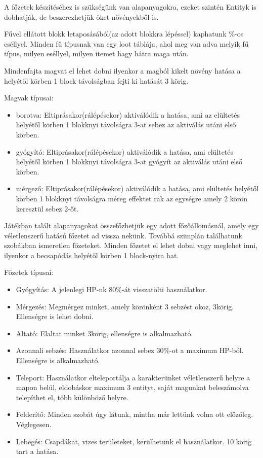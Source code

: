 A főzetek készítéséhez is szükségünk van alapanyagokra, ezeket szintén Entityk is dobhatják, de beszerezhetjük őket növényekből is.


Fűvel ellátott blokk letaposásából(az adott blokkra lépéssel) kaphatunk \%-os eséllyel.
Minden fű típusnak van egy loot táblája, ahol meg van adva melyik fű típus, milyen eséllyel, milyen itemet hagy hátra maga után.

Mindenfajta magvat el lehet dobni ilyenkor a magból kikelt növény hatása a helyétől körben 1 block távolságban fejti ki hatását 3 körig.

Magvak típusai:

\begin{itemize}
\item borotva: Eltiprásakor(rálépésekor) aktiválódik a hatása, ami az elültetés helyétől körben 1 blokknyi távolságra 3-at sebez az aktiválás utáni első körben.
\item gyógyító: Eltiprásakor(rálépésekor) aktiválódik a hatása, ami elültetés helyétől körben 1 blokknyi távolságra 3-at gyógyít az aktiválás utáni első körben.
\item mérgező: Eltiprásakor(rálépésekor) aktiválódik a hatása, ami elültetés helyétől körben 1 blokknyi távolságra méreg effektet rak az egységre amely 2 körön keresztül sebez 2-őt.
\end{itemize}



Játékban talált alapanyagokat összefőzhetjük egy adott főzőállomásnál, amely egy véletlenszerű hatású főzetet ad vissza nekünk.
Továbbá szimplán találhatunk szobákban ismeretlen főzeteket.
Minden főzetet el lehet dobni vagy meglehet inni, ilyenkor a becsapódás helyétől körben 1 block-nyira hat.

Főzetek típusai:
\begin{itemize}
\item Gyógyítás: A jelenlegi HP-nk 80\%-át visszatölti használatkor.
\item Mérgezés: Megmérgez minket, amely körönként 3 sebzést okoz, 3körig. Ellenségre is lehet dobni.
\item Altató: Elaltat minket 3körig, ellenségre is alkalmazható.
\item Azonnali sebzés: Használatkor azonnal sebez 30\%-ot a maximum HP-ból. Ellenségre is alkalmazható.
\item Teleport: Használatkor elteleportálja a karakterünket véletlenszerű helyre a mapon belül, eldobáskor maximum 3 entityt, saját magunkat beleszámolva telepíthet el, több különböző helyre.
\item Felderítő: Minden szobát úgy látunk, mintha már lettünk volna ott előzőleg. Véglegesen.
\item Lebegés: Csapdákat, vizes területeket, kerülhetünk el használatkor. 10 körig tart a hatása.
\end{itemize}

